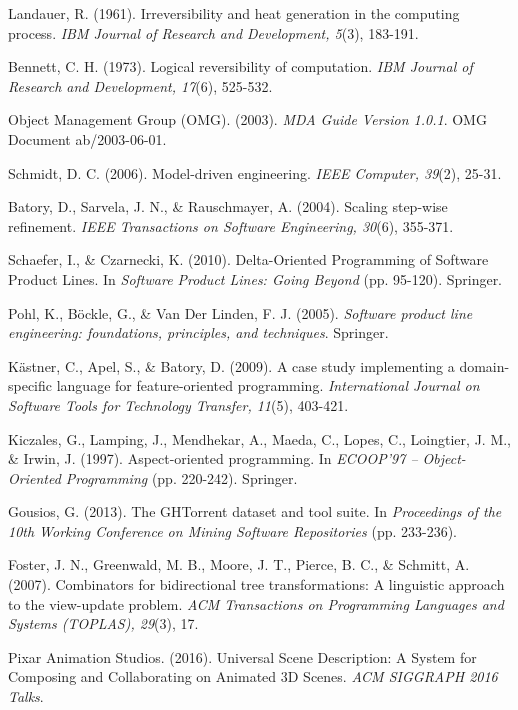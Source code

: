 \documentclass[11pt]{article}
\begin{document}
\begin{thebibliography}{99}

Landauer, R. (1961). Irreversibility and heat generation in the computing process. \textit{IBM Journal of Research and Development, 5}(3), 183-191.

Bennett, C. H. (1973). Logical reversibility of computation. \textit{IBM Journal of Research and Development, 17}(6), 525-532.

Object Management Group (OMG). (2003). \textit{MDA Guide Version 1.0.1}. OMG Document ab/2003-06-01.

Schmidt, D. C. (2006). Model-driven engineering. \textit{IEEE Computer, 39}(2), 25-31.

Batory, D., Sarvela, J. N., \& Rauschmayer, A. (2004). Scaling step-wise refinement. \textit{IEEE Transactions on Software Engineering, 30}(6), 355-371.

Schaefer, I., \& Czarnecki, K. (2010). Delta-Oriented Programming of Software Product Lines. In \textit{Software Product Lines: Going Beyond} (pp. 95-120). Springer.

Pohl, K., Böckle, G., \& Van Der Linden, F. J. (2005). \textit{Software product line engineering: foundations, principles, and techniques}. Springer.

Kästner, C., Apel, S., \& Batory, D. (2009). A case study implementing a domain-specific language for feature-oriented programming. \textit{International Journal on Software Tools for Technology Transfer, 11}(5), 403-421.

Kiczales, G., Lamping, J., Mendhekar, A., Maeda, C., Lopes, C., Loingtier, J. M., \& Irwin, J. (1997). Aspect-oriented programming. In \textit{ECOOP'97 -- Object-Oriented Programming} (pp. 220-242). Springer.

Gousios, G. (2013). The GHTorrent dataset and tool suite. In \textit{Proceedings of the 10th Working Conference on Mining Software Repositories} (pp. 233-236).

Foster, J. N., Greenwald, M. B., Moore, J. T., Pierce, B. C., \& Schmitt, A. (2007). Combinators for bidirectional tree transformations: A linguistic approach to the view-update problem. \textit{ACM Transactions on Programming Languages and Systems (TOPLAS), 29}(3), 17.

Pixar Animation Studios. (2016). Universal Scene Description: A System for Composing and Collaborating on Animated 3D Scenes. \textit{ACM SIGGRAPH 2016 Talks}.


\end{thebibliography}
\end{document}
